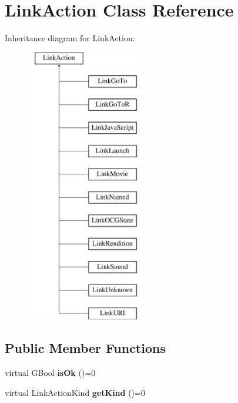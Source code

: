 \hypertarget{class_link_action}{}\section{Link\+Action Class Reference}
\label{class_link_action}
Inheritance diagram for Link\+Action\+:\begin{figure}[H]
\begin{center}
\leavevmode
\includegraphics[height=12.000000cm]{class_link_action}
\end{center}
\end{figure}
\subsection*{Public Member Functions}
\begin{DoxyCompactItemize}
\item 
\mbox{\label{class_link_action_a5bde7182a0587464349d33033f0e9863}} 
virtual G\+Bool {\bfseries is\+Ok} ()=0
\item 
\mbox{\label{class_link_action_a1b52edcf57cb9db6e96131181d03c395}} 
virtual Link\+Action\+Kind {\bfseries get\+Kind} ()=0
\end{DoxyCompactItemize}
